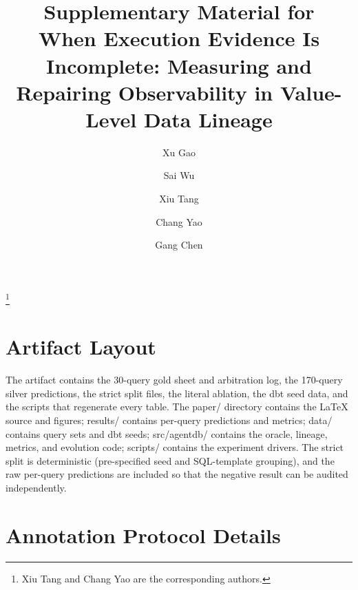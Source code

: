 \documentclass[sigconf, nonacm]{acmart}
\begin{document}
\title{Supplementary Material for\\When Execution Evidence Is Incomplete: Measuring and Repairing Observability in Value-Level Data Lineage}

\author{Xu Gao}

\author{Sai Wu}

\author{Xiu Tang}
\thanks{Xiu Tang and Chang Yao are the corresponding authors.}

\author{Chang Yao}

\author{Gang Chen}

\maketitle

\appendix
\section{Artifact Layout}
\label{app:artifact}

The artifact contains the 30-query gold sheet and arbitration log, the 170-query silver predictions, the strict split files, the literal ablation, the dbt seed data, and the scripts that regenerate every table. The paper/ directory contains the \LaTeX{} source and figures; results/ contains per-query predictions and metrics; data/ contains query sets and dbt seeds; src/agentdb/ contains the oracle, lineage, metrics, and evolution code; scripts/ contains the experiment drivers. The strict split is deterministic (pre-specified seed and SQL-template grouping), and the raw per-query predictions are included so that the negative result can be audited independently.

\section{Annotation Protocol Details}
\label{app:annotation}
\end{document}
